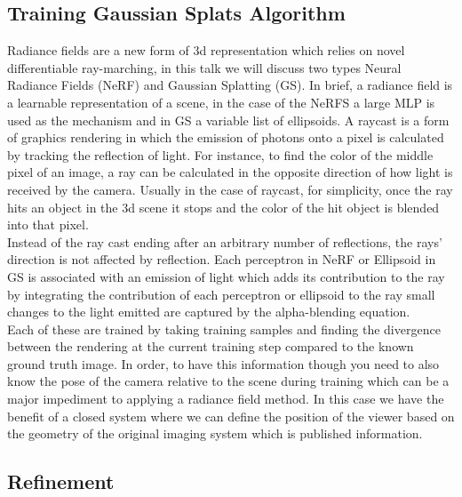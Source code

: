 \subsection{Training Gaussian Splats Algorithm}

Radiance fields are a new form of 3d representation which relies on novel differentiable ray-marching, in this talk we will discuss two types Neural Radiance Fields (NeRF) and Gaussian Splatting (GS).   In brief, a radiance field is a learnable representation of a scene, in the case of the NeRFS a large MLP is used as the mechanism and in GS a variable list of ellipsoids.  A raycast is a form of graphics rendering in which the emission of photons onto a pixel is calculated by tracking the reflection of light.  For instance, to find the color of the middle pixel of an image, a ray can be calculated in the opposite direction of how light is received by the camera.  Usually in the case of raycast, for simplicity, once the ray hits an object in the 3d scene it stops and the color of the hit object is blended into that pixel.  \\

Instead of the ray cast ending after an arbitrary number of reflections, the rays’ direction is not affected by reflection.  Each perceptron in NeRF or Ellipsoid in GS is associated with an emission of light which adds its contribution to the ray by integrating the contribution of each perceptron or ellipsoid to the ray small changes to the light emitted are captured by the alpha-blending equation.  \\

Each of these are trained by taking training samples and finding the divergence between the rendering at the current training step compared to the known ground truth image.  In order, to have this information though you need to also know the pose of the camera relative to the scene during training which can be a major impediment to applying a radiance field method. In this case we have the benefit of a closed system where we can define the position of the viewer based on the geometry of the original imaging system which is published information.  \\

\subsection{Refinement}




